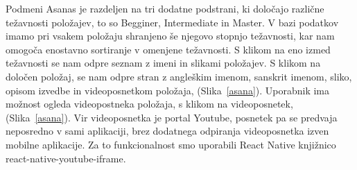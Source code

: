 \documentclass[a4paper, 12pt]{book}
\begin{document}
Podmeni Asanas je razdeljen na tri dodatne podstrani, ki določajo različne težavnosti položajev, to so Begginer, Intermediate in Master. V bazi podatkov imamo pri vsakem položaju shranjeno še njegovo stopnjo težavnosti, kar nam omogoča enostavno sortiranje v omenjene težavnosti. S klikom na eno izmed težavnosti se nam odpre seznam z imeni in slikami položajev. S klikom na določen položaj, se nam odpre stran z angleškim imenom, sanskrit imenom, sliko, opisom izvedbe in videoposnetkom položaja, (Slika~\ref{asana}). Uporabnik ima možnost ogleda videopostneka položaja, s klikom na videoposnetek, (Slika~\ref{asana}). Vir videoposnetka je portal Youtube, posnetek pa se predvaja neposredno v sami aplikaciji, brez dodatnega odpiranja videoposnetka izven mobilne aplikacije. Za to funkcionalnost smo uporabili React Native knjižnico react-native-youtube-iframe.\\
\end{document}
